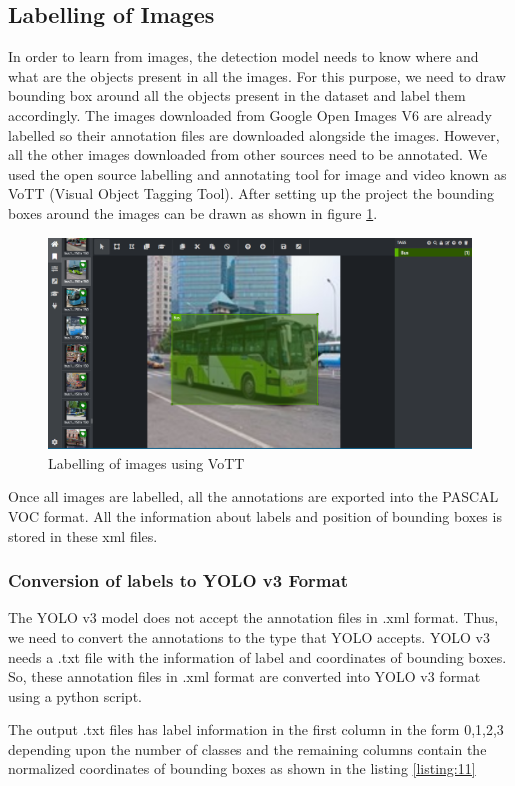  \subsection{Labelling of Images}
 In order to learn from images, the detection model needs to know where and what are the objects present in all the images. For this purpose, we need to draw bounding box around all the objects present in the dataset and label them accordingly. The images downloaded from Google Open Images V6 are already labelled so their annotation files are downloaded alongside the images. However, all the other images downloaded from other sources need to be annotated. We used the open source labelling and annotating tool for image and video known as VoTT (Visual Object Tagging Tool). After setting up the project the bounding boxes around the images can be drawn as shown in figure \ref{fig:5.7}.
\begin{figure}[H]
\centering
\captionsetup{justification = centering}
\includegraphics[scale= 0.3]{CHAPTERS/Chapter-5/images/5.7.PNG}
\caption{Labelling of images using VoTT } 
\label{fig:5.7}
\end{figure}
Once all images are labelled, all the annotations are exported into the PASCAL VOC format. All the information about labels and position of bounding boxes is stored in these xml files.
\subsubsection{Conversion of labels to YOLO v3 Format}
The YOLO v3 model does not accept the annotation files in .xml format. Thus, we need to convert the annotations to the type that YOLO accepts. YOLO v3 needs a .txt file with the information of label and coordinates of bounding boxes. So, these annotation files in .xml format are converted into YOLO v3 format using a python script. 

The output .txt files has label information in the first column in the form 0,1,2,3 depending upon the number of classes and the remaining columns contain the normalized coordinates of bounding boxes as shown in the listing \ref{listing:11}

